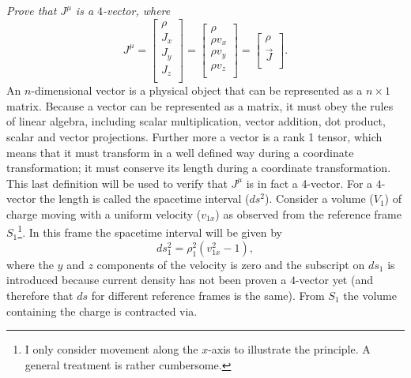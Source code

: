 \begin{example}
	\emph{Prove that $J^\mu$ is a $4$-vector, where}\newline
	\begin{equation}
		J^\mu=\begin{bmatrix}
			\rho\\
			J_x\\
			J_y\\
			J_z\\
		\end{bmatrix}=\begin{bmatrix}
			\rho\\
			\rho v_x\\
			\rho v_y\\
			\rho v_z\\
		\end{bmatrix}=\begin{bmatrix}
			\rho\\
			\vec{J}\\
		\end{bmatrix}.
	\end{equation} 
	An $n$-dimensional vector is a physical object that can be represented as a $n\times1$ matrix. Because a vector can be represented as a matrix, it must obey the rules of linear algebra, including scalar multiplication, vector addition, dot product, scalar and vector projections. Further more a vector is a rank 1 tensor, which means that it must transform in a well defined way during a coordinate transformation; it must conserve its length during a coordinate transformation. This last definition will be used to verify that $J^\mu$ is in fact a 4-vector. For a $4$-vector the length is called the spacetime interval ($ds^2$). Consider a volume ($V_1$) of charge moving with a uniform velocity ($v_{1x}$) as observed from the reference frame $S_1$\footnote{I only consider movement along the $x$-axis to illustrate the principle. A general treatment is rather cumbersome.}. In this frame the spacetime interval will be given by
	\begin{equation}
		ds_1^2=\rho_1^2(v_{1x}^2-1),
	\end{equation} 
	where the $y$ and $z$ components of the velocity is zero and the subscript on $ds_1$ is introduced because current density has not been proven a $4$-vector yet (and therefore that $ds$ for different reference frames is the same). From $S_1$ the volume containing the charge is contracted via.
	\begin{equation}

\end{equation}
\end{example}
